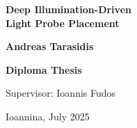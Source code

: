 \documentclass[twoside,11pt]{report}
\begin{document}
	
	\begin{titlepage}
		\begin{center}
			\vspace*{0.8cm}
			
			\Huge
			\textbf{Deep Illumination-Driven\\Light Probe Placement}
			\vspace{0.5cm}
			
			\LARGE
			\vspace{4.0cm}
			\textbf{Andreas Tarasidis}
			
			\vspace{1.5cm}
			\textbf{Diploma Thesis}
			
			\vspace{1.5cm}
			{Supervisor: Ioannis Fudos}
			
			\vspace{1.0cm}
			
			{Ioannina, July 2025}
			

\end{center}
\end{titlepage}
\end{document}
